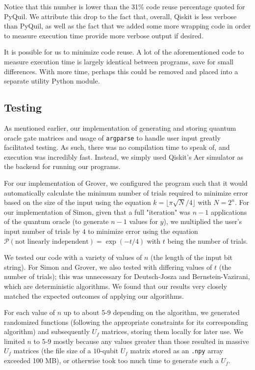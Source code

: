 \documentclass[12pt]{article}
\begin{document}
Notice that this number is lower than the 31\% code reuse percentage quoted for PyQuil.
We attribute this drop to the fact that, overall, Qiskit is less verbose than PyQuil, as well as the fact that we added some more wrapping code in order to measure execution time provide more verbose output if desired.

It is possible for us to minimize code reuse.
A lot of the aforementioned code to measure execution time is largely identical between programs, save for small differences.
With more time, perhaps this could be removed and placed into a separate utility Python module.

\subsection{Testing}

As mentioned earlier, our implementation of generating and storing quantum oracle gate matrices and usage of \texttt{argparse} to handle user input greatly facilitated testing.
As such, there was no compilation time to speak of, and execution was incredibly fast.
Instead, we simply used Qiskit's Aer simulator as the backend for running our programs.

For our implementation of Grover, we configured the program such that it would automatically calculate the minimum number of trials required to minimize error based on the size of the input using the equation $k = \lfloor\pi\sqrt{N}/4\rfloor$ with $N = 2^n$. For our implementation of Simon, given that a full "iteration" was $n-1$ applications of the quantum oracle (to generate $n-1$ values for $y$), we multiplied the user's input number of trials by $4$ to minimize error using the equation $\mathcal{P}(\text{not linearly independent}) = \exp(-t/4)$ with $t$ being the number of trials.

We tested our code with a variety of values of $n$ (the length of the input bit string).
For Simon and Grover, we also tested with differing values of $t$ (the number of trials); this was unnecessary for Deutsch-Josza and Bernstein-Vazirani, which are deterministic algorithms.
We found that our results very closely matched the expected outcomes of applying our algorithms.

For each value of $n$ up to about 5-9 depending on the algorithm, we generated randomized functions (following the appropriate constraints for its corresponding algorithm) and subsequently $U_f$ matrices, storing them locally for later use.
We limited $n$ to 5-9 mostly because any values greater than those resulted in massive $U_f$ matrices (the file size of a $10$-qubit $U_f$ matrix stored as an \texttt{.npy} array exceeded 100 MB), or otherwise took too much time to generate such a $U_f$.
\end{document}
